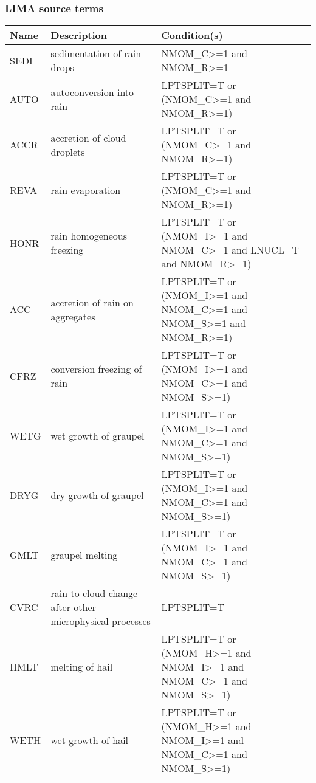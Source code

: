 \subsubsection{LIMA source terms}

\begin{longtable} {|p{}|p{}|p{}|}
\hline
Name & Description & Condition(s) \\
\hline \hline
\endhead
SEDI   & sedimentation of rain drops                              & NMOM\_C>=1 and NMOM\_R>=1 \\\hline
AUTO   & autoconversion into rain                                 & LPTSPLIT=T or (NMOM\_C>=1 and NMOM\_R>=1) \\\hline
ACCR   & accretion of cloud droplets                              & LPTSPLIT=T or (NMOM\_C>=1 and NMOM\_R>=1) \\\hline
REVA   & rain evaporation                                         & LPTSPLIT=T or (NMOM\_C>=1 and NMOM\_R>=1) \\\hline
HONR   & rain homogeneous freezing                                & LPTSPLIT=T or (NMOM\_I>=1 and NMOM\_C>=1 and LNUCL=T and NMOM\_R>=1) \\\hline
ACC    & accretion of rain on aggregates                          & LPTSPLIT=T or (NMOM\_I>=1 and NMOM\_C>=1 and NMOM\_S>=1 and NMOM\_R>=1) \\\hline
CFRZ   & conversion freezing of rain                              & LPTSPLIT=T or (NMOM\_I>=1 and NMOM\_C>=1 and NMOM\_S>=1) \\\hline
WETG   & wet growth of graupel                                    & LPTSPLIT=T or (NMOM\_I>=1 and NMOM\_C>=1 and NMOM\_S>=1) \\\hline
DRYG   & dry growth of graupel                                    & LPTSPLIT=T or (NMOM\_I>=1 and NMOM\_C>=1 and NMOM\_S>=1) \\\hline
GMLT   & graupel melting                                          & LPTSPLIT=T or (NMOM\_I>=1 and NMOM\_C>=1 and NMOM\_S>=1) \\\hline
CVRC   & rain to cloud change after other microphysical processes & LPTSPLIT=T \\\hline
HMLT   & melting of hail                                          & LPTSPLIT=T or (NMOM\_H>=1 and NMOM\_I>=1 and NMOM\_C>=1 and NMOM\_S>=1) \\\hline
WETH   & wet growth of hail                                       & LPTSPLIT=T or (NMOM\_H>=1 and NMOM\_I>=1 and NMOM\_C>=1 and NMOM\_S>=1) \\\hline

\end{longtable}
